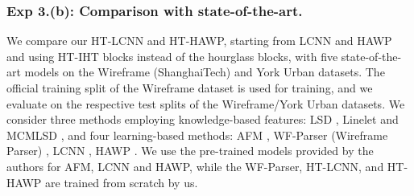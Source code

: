 \documentclass[runningheads]{llncs}
\begin{document}
\subsubsection{\textbf{Exp 3.(b):} Comparison with state-of-the-art.}
We compare our HT-LCNN and HT-HAWP, starting from  LCNN \cite{zhou2019end} and HAWP \cite{xue2020holistically} and using HT-IHT blocks instead of the hourglass blocks, with five state-of-the-art models on the Wireframe (ShanghaiTech) \cite{huang2018learning} and York Urban \cite{denis2008efficient} datasets.  
The official training split of the Wireframe dataset is used for training, and we evaluate on the respective test splits of the Wireframe\slash York Urban datasets. 
We consider three methods employing knowledge-based features: LSD \cite{von2008lsd}, Linelet \cite{cho2017novel} and MCMLSD \cite{almazan2017mcmlsd}, and four learning-based methods: 
 AFM \cite{xue2019learning}, WF-Parser (Wireframe Parser) \cite{huang2018learning}, LCNN \cite{zhou2019end}, HAWP \cite{xue2020holistically}.
We use the pre-trained models provided by the authors for AFM, LCNN and HAWP, while the WF-Parser, HT-LCNN, and HT-HAWP are trained from scratch by us.
\end{document}
